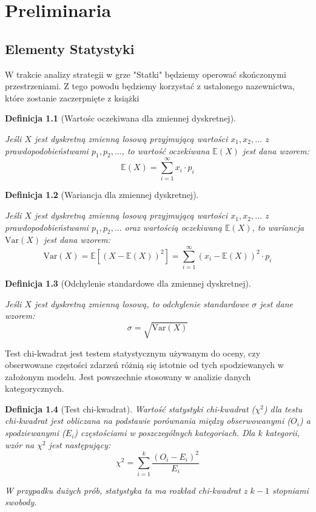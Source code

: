 \documentclass[magisterska]{pracadypl}
\newtheorem{defi}{Definicja}[section]
\begin{document}
\chapter{Preliminaria}
\section{Elementy Statystyki}

W trakcie analizy strategii w grze "Statki" będziemy operować skończonymi przestrzeniami.
Z tego powodu będziemy korzystać z ustalonego nazewnictwa, które zostanie zaczerpnięte z książki \cite{Statystyka_1} 

\begin{defi}[Wartośc oczekiwana dla zmiennej dyskretnej]\cite{Statystyka_1} 

Jeśli \( X \) jest dyskretną zmienną losową przyjmującą wartości \( x_1, x_2, \ldots \) z prawdopodobieństwami \( p_1, p_2, \ldots \), to wartość oczekiwana \( \mathbb{E}(X) \) jest dana wzorem:
\[
\mathbb{E}(X) = \sum_{i=1}^{\infty} x_i \cdot p_i
\]
\end{defi}
\begin{defi}[Wariancja dla zmiennej dyskretnej]\cite{Statystyka_1} 

Jeśli \( X \) jest dyskretną zmienną losową przyjmującą wartości \( x_1, x_2, \ldots \) z prawdopodobieństwami \( p_1, p_2, \ldots \) oraz wartością oczekiwaną \( \mathbb{E}(X) \), to wariancja \( \mathrm{Var}(X) \) jest dana wzorem:
\[
\mathrm{Var}(X) = \mathbb{E}\left[(X - \mathbb{E}(X))^2\right] = \sum_{i=1}^{\infty} (x_i - \mathbb{E}(X))^2 \cdot p_i
\]
\end{defi}
\begin{defi}[Odchylenie standardowe dla zmiennej dyskretnej]\cite{Statystyka_1} 

Jeśli \( X \) jest dyskretną zmienną losową, to odchylenie standardowe \( \sigma \) jest dane wzorem:
\[
\sigma = \sqrt{\mathrm{Var}(X)}
\]
\end{defi}

Test chi-kwadrat jest testem statystycznym używanym do oceny, czy obserwowane częstości zdarzeń różnią się istotnie od tych spodziewanych w założonym modelu. Jest powszechnie stosowany w analizie danych kategorycznych.

\begin{defi}[Test chi-kwadrat]
Wartość statystyki chi-kwadrat (\( \chi^2 \)) dla testu chi-kwadrat jest obliczana na podstawie porównania między obserwowanymi (\( O_i \)) a spodziewanymi (\( E_i \)) częstościami w poszczególnych kategoriach. Dla \( k \) kategorii, wzór na \( \chi^2 \) jest następujący:
\[ \chi^2 = \sum_{i=1}^{k} \frac{(O_i - E_i)^2}{E_i} \]

W przypadku dużych prób, statystyka ta ma rozkład chi-kwadrat z \( k-1 \) stopniami swobody.
\end{defi}
\end{document}
